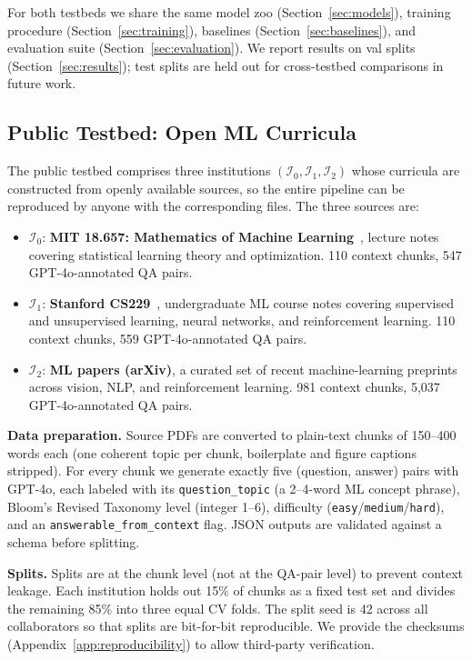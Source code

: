 \documentclass[11pt]{article}
\theoremstyle{plain}
\theoremstyle{definition}
\theoremstyle{remark}
\begin{document}
For both testbeds we share the same model zoo
(Section~\ref{sec:models}), training procedure
(Section~\ref{sec:training}), baselines
(Section~\ref{sec:baselines}), and evaluation suite
(Section~\ref{sec:evaluation}). We report results on val
splits (Section~\ref{sec:results}); test splits are held
out for cross-testbed comparisons in future work.

\subsection{Public Testbed: Open ML Curricula}
\label{sec:public_testbed}

The public testbed comprises three institutions
$(\mathcal{I}_0, \mathcal{I}_1, \mathcal{I}_2)$ whose
curricula are constructed from openly available
sources, so the entire pipeline can be reproduced by
anyone with the corresponding files. The three
sources are:
\begin{itemize}[leftmargin=1.5em, itemsep=2pt]
  \item $\mathcal{I}_0$: \textbf{MIT 18.657:
  Mathematics of Machine
  Learning}~\citep{mit18657}, lecture notes covering
  statistical learning theory and optimization. 110
  context chunks, 547 GPT-4o-annotated QA pairs.
  \item $\mathcal{I}_1$: \textbf{Stanford
  CS229}~\citep{stanfordcs229}, undergraduate ML
  course notes covering supervised and unsupervised
  learning, neural networks, and reinforcement
  learning. 110 context chunks, 559 GPT-4o-annotated
  QA pairs.
  \item $\mathcal{I}_2$: \textbf{ML papers
  (arXiv)}, a curated set of recent machine-learning
  preprints across vision, NLP, and reinforcement
  learning. 981 context chunks, 5{,}037
  GPT-4o-annotated QA pairs.
\end{itemize}

\textbf{Data preparation.}
Source PDFs are converted to plain-text chunks of
150--400 words each (one coherent topic per chunk,
boilerplate and figure captions stripped). For every
chunk we generate exactly five (question, answer)
pairs with GPT-4o, each labeled with its
\texttt{question\_topic} (a 2--4-word ML concept
phrase), Bloom's Revised Taxonomy level
(integer 1--6), difficulty
(\texttt{easy}/\texttt{medium}/\texttt{hard}), and
an \texttt{answerable\_from\_context} flag. JSON
outputs are validated against a schema before
splitting.

\textbf{Splits.}
Splits are at the chunk level (not at the QA-pair
level) to prevent context leakage. Each institution
holds out 15\% of chunks as a fixed test set and
divides the remaining 85\% into three equal CV folds.
The split seed is 42 across all collaborators so that
splits are bit-for-bit reproducible. We provide the
checksums (Appendix~\ref{app:reproducibility}) to
allow third-party verification.
\end{document}
